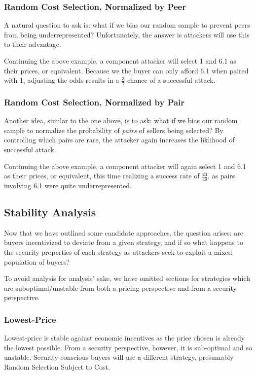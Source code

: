 \subsubsection*{Random Cost Selection, Normalized by Peer}

A natural question to ask is: what if we bias our random sample to
prevent peers from being underrepresented? Unfortunately, the answer
is attackers will use this to their advantage.

Continuing the above example, a component attacker will select 1 and
6.1 as their prices, or equivalent. Because we the buyer can only
afford 6.1 when paired with 1, adjusting the odds results in a
$\frac{3}{7}$ chance of a successful attack.

\subsubsection*{Random Cost Selection, Normalized by Pair}

Another idea, similar to the one above, is to ask: what if we bias our
random sample to normalize the probability of \emph{pairs} of sellers
being selected? By controlling which pairs are rare, the attacker
again increases the liklihood of successful attack.

Continuing the above example, a component attacker will again select 1
and 6.1 as their prices, or equivalent, this time realizing a success
rate of $\frac{24}{49}$, as pairs involving 6.1 were quite
underrepresented.

\subsection{Stability Analysis}

Now that we have outlined some candidate approaches, the question
arises: are buyers incentivized to deviate from a given strategy, and
if so what happens to the security properties of each strategy as
attackers seek to exploit a mixed population of buyers?

To avoid analysis for analysis' sake, we have omitted sections for
strategies which are suboptimal/unstable from both a pricing
perspective and from a security perspective.

\subsubsection*{Lowest-Price}

Lowest-price is stable against economic incentives as the price chosen
is already the lowest possible. From a security perspective, however,
it is sub-optimal and so unstable. Security-conscious buyers will use
a different strategy, presumably Random Selection Subject to Cost.

